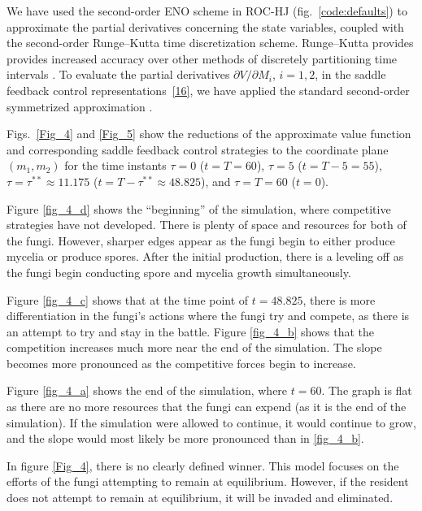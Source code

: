\documentclass[11pt]{amsart}
\begin{document}
We have used the second-order ENO scheme in ROC-HJ (fig.~\ref{code:defaults}) to approximate the partial
derivatives concerning the state variables, coupled with the 
second-order Runge--Kutta time discretization scheme. Runge--Kutta provides provides increased accuracy over other methods of discretely partitioning time intervals \cite{ROCHJ2019}.
To evaluate the partial derivatives $ \partial V / \partial M_i $, $ i = 1,2 $,
in the saddle feedback control representations~\cref{16}, we have applied the
standard second-order symmetrized approximation
\cite[\S 5.7]{PressTeukolskyVetterlingFlannery2007}.

Figs.~\ref{Fig_4} and \ref{Fig_5} show the reductions of the approximate
value function and corresponding saddle feedback control strategies to the
coordinate plane $ (m_1, m_2) $ for the time instants 
$ \tau = 0 $ ($ t = T = 60 $), $ \tau = 5 $ ($ t = T - 5 = 55 $),
$ \tau = \tau^{**} 
\approx 11.175 $ ($ t = T - \tau^{**} \approx 48.825 $),
and $ \tau = T = 60 $ ($ t = 0 $). 


Figure \ref{fig_4_d} shows the ``beginning'' of the simulation, where competitive strategies have not developed. There is plenty of space and resources for both of the fungi. However, sharper edges appear as the fungi begin to either produce mycelia or produce spores. After the initial production, there is a leveling off as the fungi begin conducting spore and mycelia growth simultaneously.

Figure \ref{fig_4_c} shows that at the time point of $t=48.825$, there is more differentiation in the fungi's actions where the fungi try and compete, as there is an attempt to try and stay in the battle. Figure \ref{fig_4_b} shows that the competition increases much more near the end of the simulation. The slope becomes more pronounced as the competitive forces begin to increase.

Figure \ref{fig_4_a} shows the end of the simulation, where $t=60$. The graph is flat as there are no more resources that the fungi can expend (as it is the end of the simulation). If the simulation were allowed to continue, it would continue to grow, and the slope would most likely be more pronounced than in \ref{fig_4_b}. 

In figure \ref{Fig_4}, there is no clearly defined winner. This model focuses on the efforts of the fungi attempting to remain at equilibrium. However, if the resident does not attempt to remain at equilibrium, it will be invaded and eliminated.
\end{document}
